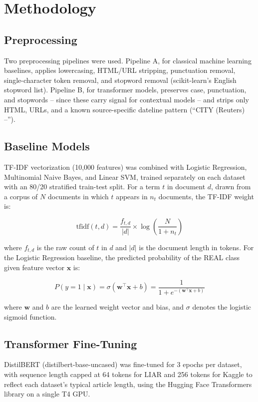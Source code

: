 \documentclass[conference]{IEEEtran}
\begin{document}
\section{Methodology}
\subsection{Preprocessing}
Two preprocessing pipelines were used. Pipeline A, for classical machine learning baselines, applies lowercasing, HTML/URL stripping, punctuation removal, single-character token removal, and stopword removal (scikit-learn's English stopword list). Pipeline B, for transformer models, preserves case, punctuation, and stopwords -- since these carry signal for contextual models -- and strips only HTML, URLs, and a known source-specific dateline pattern (``CITY (Reuters) --'').

\subsection{Baseline Models}
TF-IDF vectorization (10,000 features) was combined with Logistic Regression, Multinomial Naive Bayes, and Linear SVM, trained separately on each dataset with an 80/20 stratified train-test split. For a term $t$ in document $d$, drawn from a corpus of $N$ documents in which $t$ appears in $n_t$ documents, the TF-IDF weight is:

\begin{equation}
\text{tfidf}(t, d) = \frac{f_{t,d}}{|d|} \times \log\left(\frac{N}{1 + n_t}\right)
\end{equation}

where $f_{t,d}$ is the raw count of $t$ in $d$ and $|d|$ is the document length in tokens. For the Logistic Regression baseline, the predicted probability of the REAL class given feature vector $\mathbf{x}$ is:

\begin{equation}
P(y = 1 \mid \mathbf{x}) = \sigma(\mathbf{w}^\top\mathbf{x} + b) = \frac{1}{1 + e^{-(\mathbf{w}^\top\mathbf{x} + b)}}
\end{equation}

where $\mathbf{w}$ and $b$ are the learned weight vector and bias, and $\sigma$ denotes the logistic sigmoid function.

\subsection{Transformer Fine-Tuning}
DistilBERT (distilbert-base-uncased) was fine-tuned for 3 epochs per dataset, with sequence length capped at 64 tokens for LIAR and 256 tokens for Kaggle to reflect each dataset's typical article length, using the Hugging Face Transformers library on a single T4 GPU.
\end{document}
